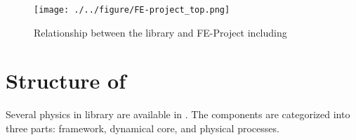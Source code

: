 \begin{figure}[hbt]
\begin{center}
  \texttt{[image: ./../figure/FE-project\_top.png]}\\
  \caption{Relationship between the library \scalelib and FE-Project including \scaledg}
  \label{fig:FE-Project_relation}
\end{center}
\end{figure}


\section{Structure of \scaledg}  \label{subsec:sturcture_scale_rm}
Several physics in \scalelib library are available in \scaledg.
The components are categorized into three parts:
framework, dynamical core, and physical processes.

